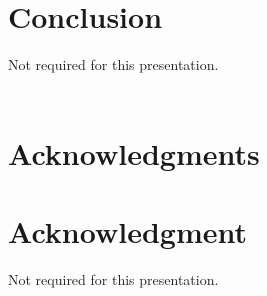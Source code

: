 \documentclass[conference]{IEEEtran}
\begin{document}
\section{Conclusion}
Not required for this presentation.
\\\\
\ifCLASSOPTIONcompsoc
  \section*{Acknowledgments}
\else
  \section*{Acknowledgment}
\fi
Not required for this presentation.



\end{document}
